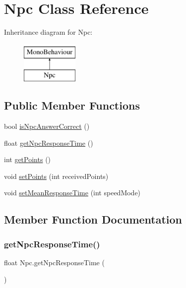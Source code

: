 \hypertarget{classNpc}{}\section{Npc Class Reference}
\label{classNpc}
Inheritance diagram for Npc\+:\begin{figure}[H]
\begin{center}
\leavevmode
\includegraphics[height=2.000000cm]{classNpc}
\end{center}
\end{figure}
\subsection*{Public Member Functions}
\begin{DoxyCompactItemize}
\item 
bool \hyperlink{classNpc_a11e42e0b414126068d1dda54bb590c6d}{is\+Npc\+Answer\+Correct} ()
\item 
float \hyperlink{classNpc_a056b965b7212121fcb22b6db4b2567d2}{get\+Npc\+Response\+Time} ()
\item 
int \hyperlink{classNpc_a213fad208ad80e3962bffd0d1fb5e57b}{get\+Points} ()
\item 
void \hyperlink{classNpc_a9311d6bf9a43936d51656f81b706e6dc}{set\+Points} (int received\+Points)
\item 
void \hyperlink{classNpc_afc324d3e1b79722de57daf4159602f70}{set\+Mean\+Response\+Time} (int speed\+Mode)
\end{DoxyCompactItemize}


\subsection{Member Function Documentation}
\mbox{\label{classNpc_a056b965b7212121fcb22b6db4b2567d2}} 
\subsubsection{\texorpdfstring{get\+Npc\+Response\+Time()}{getNpcResponseTime()}}
{\footnotesize\ttfamily float Npc.\+get\+Npc\+Response\+Time (\begin{DoxyParamCaption}{ }\end{DoxyParamCaption})\hspace{0.3cm}{\ttfamily [inline]}}

